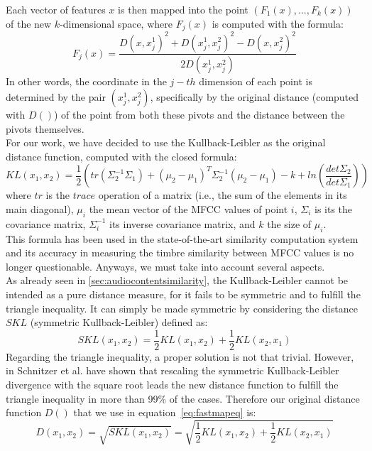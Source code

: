 Each vector of features $x$ is then mapped into the point $(F_1(x), ..., F_k(x))$ of the new $k$-dimensional space, where $F_j(x)$ is computed with the formula:
\begin{equation}
\label{eq:fastmapeq}
F_j(x) = \frac{D(x, x_j^1)^2 + D(x_j^1, x_j^2)^2 - D(x, x_j^2)^2}{2D(x_j^1, x_j^2)}
\end{equation}
In other words, the coordinate in the $j-th$ dimension of each point is determined by the pair $(x_j^1, x_j^2)$, specifically by the original distance (computed with $D()$) of the point from both these pivots and the distance between the pivots themselves. \\
For our work, we have decided to use the Kullback-Leibler as the original distance function, computed with the closed formula:
\begin{equation}
KL(x_1, x_2) = \frac{1}{2}\left(tr(\Sigma_2^{-1}\Sigma_1) + (\mu_2 - \mu_1)^T \Sigma_2^{-1}(\mu_2 - \mu_1) - k + ln\left(\frac{det\Sigma_2}{det\Sigma_1}\right)\right)
\end{equation}
where $tr$ is the $trace$ operation of a matrix (i.e., the sum of the elements in its main diagonal), $\mu_i$ the mean vector of the MFCC values of point $i$, $\Sigma_i$ is its the covariance matrix, $\Sigma_i^{-1}$ its inverse covariance matrix, and $k$ the size of $\mu_i$. \\
This formula has been used in the state-of-the-art similarity computation system and its accuracy in measuring the timbre similarity between MFCC values is no longer questionable. Anyways, we must take into account several aspects. \\ 
As already seen in \ref{sec:audiocontentsimilarity}, the Kullback-Leibler cannot be intended as a pure distance measure, for it fails to be symmetric and to fulfill the triangle inequality. It can simply be made symmetric by considering the distance $SKL$ (symmetric Kullback-Leibler) defined as:
\begin{equation}
SKL(x_1, x_2) = \frac{1}{2}KL(x_1, x_2) + \frac{1}{2}KL(x_2, x_1)
\end{equation}
Regarding the triangle inequality, a proper solution is not that trivial. However, in \cite{fastmap12} Schnitzer et al. have shown that rescaling the symmetric Kullback-Leibler divergence with the square root leads the new distance function to fulfill the triangle inequality in more than 99\% of the cases. Therefore our original distance function $D()$ that we use in equation~\ref{eq:fastmapeq} is:
\begin{equation}
\label{eq:distance_func}
D(x_1, x_2) = \sqrt{SKL(x_1, x_2)} = \sqrt{\frac{1}{2}KL(x_1, x_2) + \frac{1}{2}KL(x_2, x_1)}
\end{equation}

